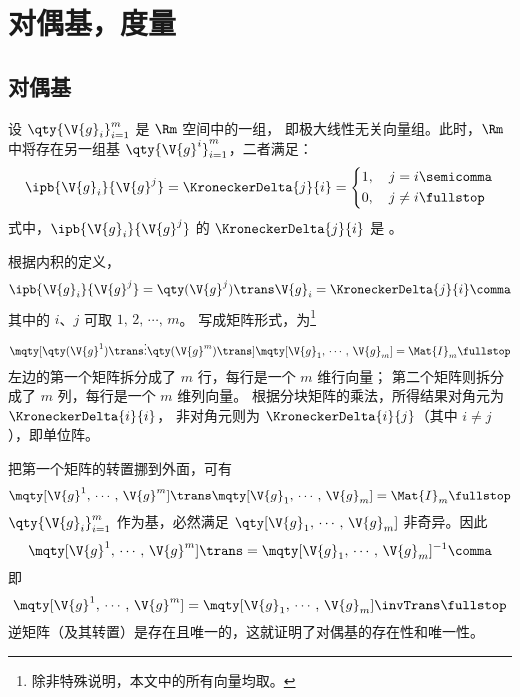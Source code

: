 \section{对偶基，度量}
\subsection{对偶基} \label{subsec:对偶基}
设 $\qty{\V{g}_i}^m_{i=1}$ 是 $\Rm$ 空间中的一组，
即极大线性无关向量组。此时，$\Rm$ 中将存在另一组基
$\qty{\V{g}^i}^m_{i=1}$，二者满足：
\begin{equation}
	\ipb{\V{g}_i}{\V{g}^j}=\KroneckerDelta{j}{i}
	=\left\{\begin{aligned}
		1,\quad j&=i \semicomma\\
		0,\quad j&\neq i \fullstop
	\end{aligned}\right.
	\label{eq:对偶关系}
\end{equation}
式中，$\ipb{\V{g}_i}{\V{g}^j}$ 的 $\KroneckerDelta{j}{i}$ 是 
。

\begin{myProof}
根据内积的定义，
\begin{equation}
	\ipb{\V{g}_i}{\V{g}^j}=\qty(\V{g}^j)\trans\V{g}_i
	=\KroneckerDelta{j}{i} \comma
\end{equation}
其中的 $i$、$j$ 可取 $1,\,2,\,\cdots,\,m$。
写成矩阵形式，为\footnote{
	除非特殊说明，本文中的所有向量均取。}
\begin{equation}
	\mqty[\qty(\V{g}^1)\trans \\ \vdots \\ \qty(\V{g}^m)\trans]
	\mqty[\V{g}_1,\,\cdots,\,\V{g}_m] = \Mat{I}_m \fullstop
\end{equation}
左边的第一个矩阵拆分成了 $m$ 行，每行是一个 $m$ 维行向量；
第二个矩阵则拆分成了 $m$ 列，每行是一个 $m$ 维列向量。
根据分块矩阵的乘法，所得结果对角元为 $\KroneckerDelta{i}{i}$，
非对角元则为 $\KroneckerDelta{i}{j}$（其中 $i\neq j$），即单位阵。

把第一个矩阵的转置挪到外面，可有
\begin{equation}
	\mqty[\V{g}^1,\,\cdots,\,\V{g}^m]\trans
	\mqty[\V{g}_1,\,\cdots,\,\V{g}_m] = \Mat{I}_m \fullstop
\end{equation}
$\qty{\V{g}_i}^m_{i=1}$ 作为基，必然满足
$\qty[\V{g}_1,\,\cdots,\,\V{g}_m]$ 非奇异。因此
\begin{equation}
	\mqty[\V{g}^1,\,\cdots,\,\V{g}^m]\trans
	=\mqty[\V{g}_1,\,\cdots,\,\V{g}_m]^{-1} \comma
\end{equation}
即
\begin{equation}
	\mqty[\V{g}^1,\,\cdots,\,\V{g}^m]
	=\mqty[\V{g}_1,\,\cdots,\,\V{g}_m]\invTrans \fullstop
	\label{eq:逆变基用协变基表示}
\end{equation}
逆矩阵（及其转置）是存在且唯一的，这就证明了对偶基的存在性和唯一性。
\end{myProof}

